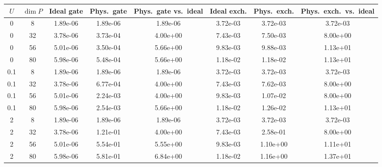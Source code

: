 \begin{tabular}{cccccccc}
\hline
$U$ & $\dim P$ & Ideal gate & Phys.\ gate & Phys.\ gate vs.\ ideal & Ideal exch. & Phys.\ exch. & Phys.\ exch.\ vs.\ ideal \\
\hline
0 & 8 & 1.89e-06 & 1.89e-06 & 1.89e-06 & 3.72e-03 & 3.72e-03 & 3.72e-03 \\
0 & 32 & 3.78e-06 & 3.73e-04 & 4.00e+00 & 7.43e-03 & 7.50e-03 & 8.00e+00 \\
0 & 56 & 5.01e-06 & 3.50e-04 & 5.66e+00 & 9.83e-03 & 9.88e-03 & 1.13e+01 \\
0 & 80 & 5.98e-06 & 5.48e-04 & 5.66e+00 & 1.18e-02 & 1.18e-02 & 1.13e+01 \\
\hline
0.1 & 8 & 1.89e-06 & 1.89e-06 & 1.89e-06 & 3.72e-03 & 3.72e-03 & 3.72e-03 \\
0.1 & 32 & 3.78e-06 & 6.77e-04 & 4.00e+00 & 7.43e-03 & 7.62e-03 & 8.00e+00 \\
0.1 & 56 & 5.01e-06 & 2.24e-03 & 4.00e+00 & 9.83e-03 & 1.07e-02 & 8.00e+00 \\
0.1 & 80 & 5.98e-06 & 2.54e-03 & 5.66e+00 & 1.18e-02 & 1.26e-02 & 1.13e+01 \\
\hline
2 & 8 & 1.89e-06 & 1.89e-06 & 1.89e-06 & 3.72e-03 & 3.72e-03 & 3.72e-03 \\
2 & 32 & 3.78e-06 & 1.21e-01 & 4.00e+00 & 7.43e-03 & 2.58e-01 & 8.00e+00 \\
2 & 56 & 5.01e-06 & 5.54e-01 & 5.55e+00 & 9.83e-03 & 1.10e+00 & 1.11e+01 \\
2 & 80 & 5.98e-06 & 5.81e-01 & 6.84e+00 & 1.18e-02 & 1.16e+00 & 1.37e+01 \\
\hline
\end{tabular}
